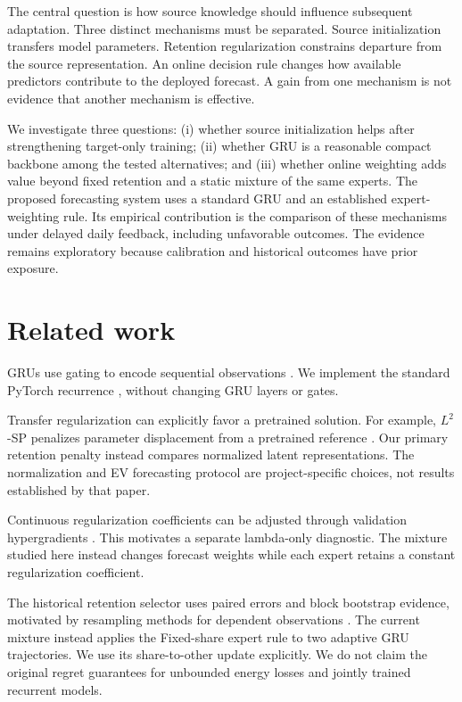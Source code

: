 \documentclass[pdflatex,iicol,sn-mathphys-num]{sn-jnl}
\begin{document}
The central question is how source knowledge should influence subsequent adaptation. Three distinct mechanisms must be separated. Source initialization transfers model parameters. Retention regularization constrains departure from the source representation. An online decision rule changes how available predictors contribute to the deployed forecast. A gain from one mechanism is not evidence that another mechanism is effective.

We investigate three questions: (i) whether source initialization helps after strengthening target-only training; (ii) whether GRU is a reasonable compact backbone among the tested alternatives; and (iii) whether online weighting adds value beyond fixed retention and a static mixture of the same experts. The proposed forecasting system uses a standard GRU and an established expert-weighting rule. Its empirical contribution is the comparison of these mechanisms under delayed daily feedback, including unfavorable outcomes. The evidence remains exploratory because calibration and historical outcomes have prior exposure.

\section{Related work}
GRUs use gating to encode sequential observations \cite{cho2014}. We implement the standard PyTorch recurrence \cite{pytorch211}, without changing GRU layers or gates.

Transfer regularization can explicitly favor a pretrained solution. For example, $L^2$-SP penalizes parameter displacement from a pretrained reference \cite{li2018}. Our primary retention penalty instead compares normalized latent representations. The normalization and EV forecasting protocol are project-specific choices, not results established by that paper.

Continuous regularization coefficients can be adjusted through validation hypergradients \cite{luketina2016}. This motivates a separate lambda-only diagnostic. The mixture studied here instead changes forecast weights while each expert retains a constant regularization coefficient.

The historical retention selector uses paired errors and block bootstrap evidence, motivated by resampling methods for dependent observations \cite{kunsch1989}. The current mixture instead applies the Fixed-share expert rule \cite{herbster1998} to two adaptive GRU trajectories. We use its share-to-other update explicitly. We do not claim the original regret guarantees for unbounded energy losses and jointly trained recurrent models.
\end{document}

